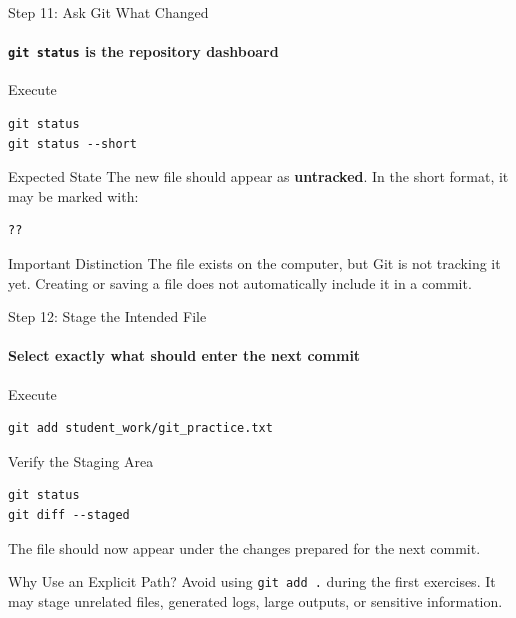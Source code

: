\begin{frame}[fragile]{Step 11: Ask Git What Changed}
\framesubtitle{\texttt{git status} is the repository dashboard}

\footnotesize

\begin{block}{Execute}
\begin{verbatim}
git status
git status --short
\end{verbatim}
\end{block}

\begin{exampleblock}{Expected State}
The new file should appear as \textbf{untracked}. In the short format,
it may be marked with:

\begin{verbatim}
??
\end{verbatim}
\end{exampleblock}

\begin{alertblock}{Important Distinction}
The file exists on the computer, but Git is not tracking it yet.
Creating or saving a file does not automatically include it in a commit.
\end{alertblock}

\end{frame}

\begin{frame}[fragile]{Step 12: Stage the Intended File}
\framesubtitle{Select exactly what should enter the next commit}

\footnotesize

\begin{block}{Execute}
\begin{verbatim}
git add student_work/git_practice.txt
\end{verbatim}
\end{block}

\begin{exampleblock}{Verify the Staging Area}
\begin{verbatim}
git status
git diff --staged
\end{verbatim}

The file should now appear under the changes prepared for the next commit.
\end{exampleblock}

\begin{alertblock}{Why Use an Explicit Path?}
Avoid using \texttt{git add .} during the first exercises. It may stage
unrelated files, generated logs, large outputs, or sensitive information.
\end{alertblock}

\end{frame}

